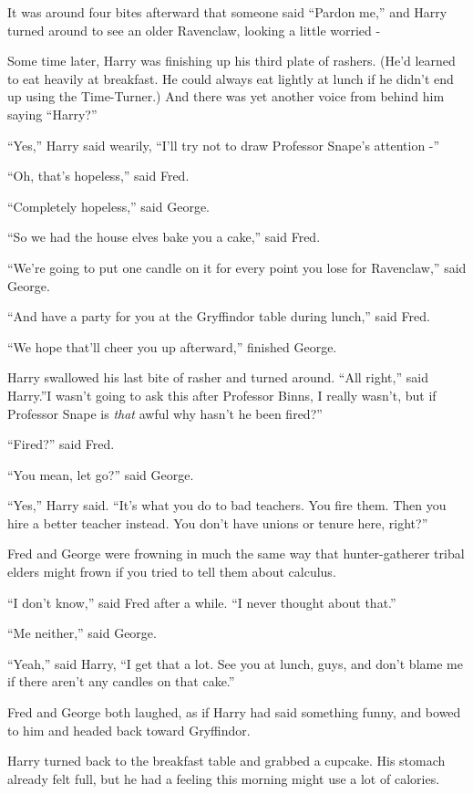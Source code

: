 It was around four bites afterward that someone said ``Pardon me,'' and
Harry turned around to see an older Ravenclaw, looking a little worried
-

Some time later, Harry was finishing up his third plate of rashers.
(He'd learned to eat heavily at breakfast. He could always eat lightly
at lunch if he didn't end up using the Time-Turner.) And there was yet
another voice from behind him saying ``Harry?''

``Yes,'' Harry said wearily, ``I'll try not to draw Professor Snape's
attention -''

``Oh, that's hopeless,'' said Fred.

``Completely hopeless,'' said George.

``So we had the house elves bake you a cake,'' said Fred.

``We're going to put one candle on it for every point you lose for
Ravenclaw,'' said George.

``And have a party for you at the Gryffindor table during lunch,'' said
Fred.

``We hope that'll cheer you up afterward,'' finished George.

Harry swallowed his last bite of rasher and turned around. ``All
right,'' said Harry.''I wasn't going to ask this after Professor Binns,
I really wasn't, but if Professor Snape is \emph{that} awful why hasn't
he been fired?''

``Fired?'' said Fred.

``You mean, let go?'' said George.

``Yes,'' Harry said. ``It's what you do to bad teachers. You fire them.
Then you hire a better teacher instead. You don't have unions or tenure
here, right?''

Fred and George were frowning in much the same way that hunter-gatherer
tribal elders might frown if you tried to tell them about calculus.

``I don't know,'' said Fred after a while. ``I never thought about
that.''

``Me neither,'' said George.

``Yeah,'' said Harry, ``I get that a lot. See you at lunch, guys, and
don't blame me if there aren't any candles on that cake.''

Fred and George both laughed, as if Harry had said something funny, and
bowed to him and headed back toward Gryffindor.

Harry turned back to the breakfast table and grabbed a cupcake. His
stomach already felt full, but he had a feeling this morning might use a
lot of calories.

